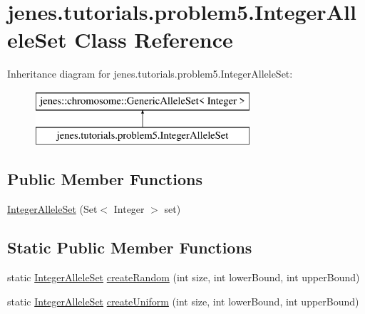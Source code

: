 \hypertarget{classjenes_1_1tutorials_1_1problem5_1_1_integer_allele_set}{\section{jenes.\-tutorials.\-problem5.\-Integer\-Allele\-Set Class Reference}
\label{classjenes_1_1tutorials_1_1problem5_1_1_integer_allele_set}
}
Inheritance diagram for jenes.\-tutorials.\-problem5.\-Integer\-Allele\-Set\-:\begin{figure}[H]
\begin{center}
\leavevmode
\includegraphics[height=2.000000cm]{classjenes_1_1tutorials_1_1problem5_1_1_integer_allele_set}
\end{center}
\end{figure}
\subsection*{Public Member Functions}
\begin{DoxyCompactItemize}
\item 
\hyperlink{classjenes_1_1tutorials_1_1problem5_1_1_integer_allele_set_aa8b7a7bdc514aca55686da39f7e430b6}{Integer\-Allele\-Set} (Set$<$ Integer $>$ set)
\end{DoxyCompactItemize}
\subsection*{Static Public Member Functions}
\begin{DoxyCompactItemize}
\item 
static \hyperlink{classjenes_1_1tutorials_1_1problem5_1_1_integer_allele_set}{Integer\-Allele\-Set} \hyperlink{classjenes_1_1tutorials_1_1problem5_1_1_integer_allele_set_af241f0e8dd6564fb5b4c0047eb150bac}{create\-Random} (int size, int lower\-Bound, int upper\-Bound)
\item 
static \hyperlink{classjenes_1_1tutorials_1_1problem5_1_1_integer_allele_set}{Integer\-Allele\-Set} \hyperlink{classjenes_1_1tutorials_1_1problem5_1_1_integer_allele_set_a20d2ef7f0a59edafa82345db48fcefa3}{create\-Uniform} (int size, int lower\-Bound, int upper\-Bound)
\end{DoxyCompactItemize}


